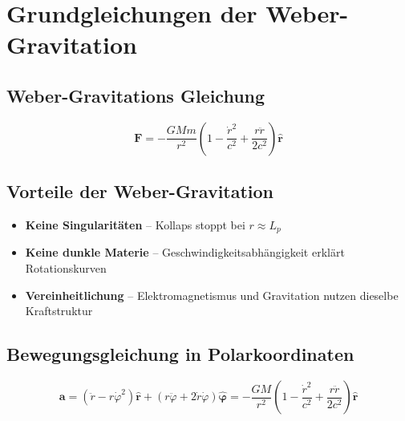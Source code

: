 \section{Grundgleichungen der Weber-Gravitation}
\subsection*{Weber-Gravitations Gleichung}
\begin{equation}\label{eq:weber_gravitationskraft}
\mathbf{F} = -\frac{GMm}{r^2}\left(1 - \frac{\dot{r}^2}{c^2} + \frac{r\ddot{r}}{2c^2}\right)\mathbf{\hat{r}}
\end{equation}

\subsection{Vorteile der Weber-Gravitation}
\begin{itemize}
\item \textbf{Keine Singularitäten} – Kollaps stoppt bei $r \approx L_p$
\item \textbf{Keine dunkle Materie} – Geschwindigkeitsabhängigkeit erklärt Rotationskurven
\item \textbf{Vereinheitlichung} – Elektromagnetismus und Gravitation nutzen dieselbe Kraftstruktur
\end{itemize}

\subsection*{Bewegungsgleichung in Polarkoordinaten}
\begin{equation}\label{eq:weber_bewegungsgleichung}
\mathbf{a} = \left(\ddot{r} - r\dot{\varphi}^2\right)\mathbf{\hat{r}} + \left(r\ddot{\varphi} + 2\dot{r}\dot{\varphi}\right)\mathbf{\hat{\varphi}} = -\frac{GM}{r^2}\left(1 - \frac{\dot{r}^2}{c^2} + \frac{r\ddot{r}}{2c^2}\right)\mathbf{\hat{r}}
\end{equation}


